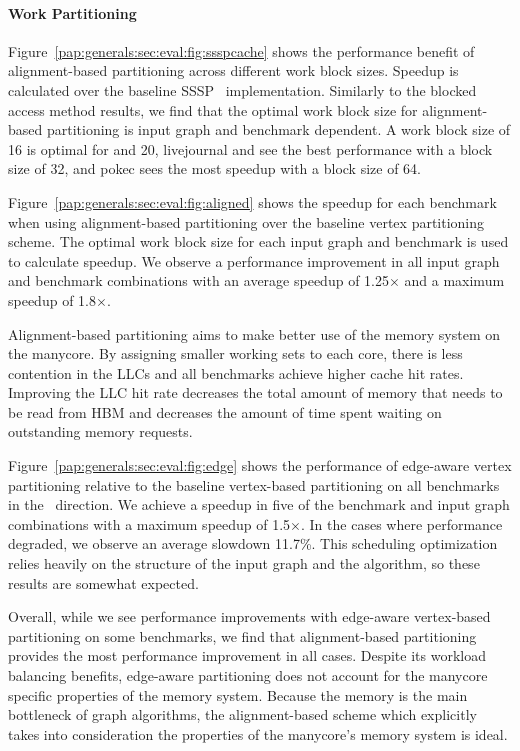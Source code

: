 \paragraph{Work Partitioning}
 
\cacheSSSPFigure
 
\allAlignedFigure
 
Figure~\ref{pap:generals:sec:eval:fig:ssspcache} shows the performance benefit of alignment-based partitioning across different work block sizes.
Speedup is calculated over the baseline SSSP \pull~implementation. 
Similarly to the blocked access method results, we find that the optimal work block size for alignment-based partitioning is input graph and benchmark dependent. 
A work block size of 16 is optimal for  and 20, livejournal and  see the best performance with a block size of 32, and pokec sees the most speedup with a block size of 64.
 
Figure~\ref{pap:generals:sec:eval:fig:aligned} shows the speedup for each benchmark when using alignment-based partitioning over the baseline vertex partitioning scheme. The optimal work block size for each input graph and benchmark is used to calculate speedup. 
We observe a performance improvement in all input graph and benchmark combinations with an average speedup of 1.25$\times$ and a maximum speedup of 1.8$\times$. 
 
Alignment-based partitioning aims to make better use of the memory system on the manycore. 
By assigning smaller working sets to each core, there is less contention in the LLCs and all benchmarks achieve higher cache hit rates. 
Improving the LLC hit rate decreases the total amount of memory that needs to be read from HBM and decreases the amount of time spent waiting on outstanding memory requests.
 
 
\edgeSpeedupFigure
 
Figure~\ref{pap:generals:sec:eval:fig:edge} shows the performance of edge-aware vertex partitioning relative to the baseline vertex-based partitioning on all benchmarks in the \pull~direction. 
We achieve a speedup in five of the benchmark and input graph combinations with a maximum speedup of 1.5$\times$.
In the cases where performance degraded, we observe an average slowdown 11.7\%. 
This scheduling optimization relies heavily on the structure of the input graph and the algorithm, so these results are somewhat expected.
 
Overall, while we see performance improvements with edge-aware vertex-based partitioning on some benchmarks, we find that alignment-based partitioning provides the most performance improvement in all cases. 
Despite its workload balancing benefits, edge-aware partitioning does not account for the manycore specific properties of the memory system.
Because the memory is the main bottleneck of graph algorithms, the alignment-based scheme which explicitly takes into consideration the properties of the manycore's memory system is ideal. 
 
